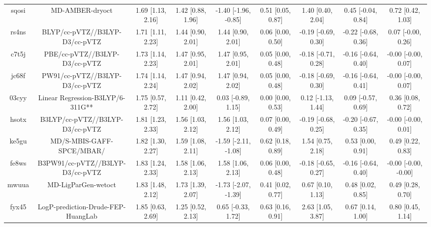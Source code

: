 \documentclass{article}
\begin{document}
\begin{center}
\begin{longtable}{|ccccccccc|}
 sqosi &                                    MD-AMBER-dryoct &  1.69 [1.13, 2.16] &  1.42 [0.88, 1.96] &  -1.40 [-1.96, -0.85] &  0.51 [0.05, 0.87] &    1.40 [0.40, 2.04] &   0.45 [-0.04, 0.84] &     0.72 [0.42, 1.03] \\
 rs4ns &                     BLYP/cc-pVTZ//B3LYP-D3/cc-pVTZ &  1.71 [1.11, 2.23] &  1.44 [0.90, 2.01] &     1.44 [0.90, 2.01] &  0.06 [0.00, 0.50] &  -0.19 [-0.69, 0.30] &  -0.22 [-0.68, 0.36] &    0.07 [-0.00, 0.26] \\
 c7t5j &                      PBE/cc-pVTZ//B3LYP-D3/cc-pVTZ &  1.73 [1.14, 2.23] &  1.47 [0.95, 2.01] &     1.47 [0.95, 2.01] &  0.05 [0.00, 0.48] &  -0.18 [-0.71, 0.28] &  -0.16 [-0.64, 0.40] &   -0.00 [-0.00, 0.07] \\
 jc68f &                     PW91/cc-pVTZ//B3LYP-D3/cc-pVTZ &  1.74 [1.14, 2.24] &  1.47 [0.94, 2.02] &     1.47 [0.94, 2.02] &  0.05 [0.00, 0.48] &  -0.18 [-0.69, 0.30] &  -0.16 [-0.64, 0.41] &   -0.00 [-0.00, 0.07] \\
 03cyy &                   Linear Regression-B3LYP/6-311G** &  1.75 [0.57, 2.72] &  1.11 [0.42, 2.00] &    0.03 [-0.89, 1.15] &  0.00 [0.00, 0.53] &   0.12 [-1.13, 1.44] &   0.09 [-0.57, 0.69] &     0.36 [0.08, 0.72] \\
 hsotx &                    B3LYP/cc-pVTZ//B3LYP-D3/cc-pVTZ &  1.81 [1.23, 2.33] &  1.56 [1.03, 2.12] &     1.56 [1.03, 2.12] &  0.07 [0.00, 0.49] &  -0.19 [-0.68, 0.25] &  -0.20 [-0.67, 0.35] &   -0.00 [-0.00, 0.01] \\
 ke5gu &                          MD/S-MBIS-GAFF-SPCE/MBAR/ &  1.82 [1.30, 2.27] &  1.59 [1.08, 2.11] &  -1.59 [-2.11, -1.08] &  0.62 [0.18, 0.89] &    1.54 [0.75, 2.18] &    0.53 [0.00, 0.91] &     0.49 [0.22, 0.83] \\
 fe8ws &                   B3PW91/cc-pVTZ//B3LYP-D3/cc-pVTZ &  1.83 [1.24, 2.33] &  1.58 [1.06, 2.13] &     1.58 [1.06, 2.13] &  0.06 [0.00, 0.48] &  -0.18 [-0.65, 0.27] &  -0.16 [-0.64, 0.40] &  -0.00 [-0.00, -0.00] \\
 mwuua &                                MD-LigParGen-wetoct &  1.83 [1.48, 2.12] &  1.73 [1.39, 2.07] &  -1.73 [-2.07, -1.39] &  0.41 [0.02, 0.77] &    0.67 [0.10, 1.13] &    0.48 [0.02, 0.85] &     0.49 [0.28, 0.70] \\
 fyx45 &                 LogP-prediction-Drude-FEP-HuangLab &  1.85 [0.63, 2.69] &  1.25 [0.52, 2.13] &    0.65 [-0.33, 1.72] &  0.63 [0.16, 0.91] &    2.63 [1.05, 3.87] &    0.67 [0.14, 1.00] &     0.80 [0.45, 1.14] \\

\end{longtable}
\end{center}
\end{document}
